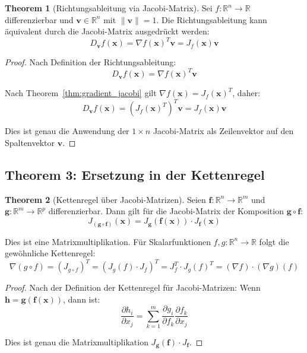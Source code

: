 ﻿\documentclass[a4paper,12pt]{article}
\theoremstyle{definition}
\newtheorem{theorem}{Theorem}
\begin{document}
\begin{theorem}[Richtungsableitung via Jacobi-Matrix]
	\label{thm:directional}
	Sei $f: \mathbb{R}^n \to \mathbb{R}$ differenzierbar und $\boldsymbol{v} \in \mathbb{R}^n$ mit $\|\boldsymbol{v}\| = 1$. Die Richtungsableitung kann äquivalent durch die Jacobi-Matrix ausgedrückt werden:
	\[
	D_{\boldsymbol{v}} f(\boldsymbol{x}) = \nabla f(\boldsymbol{x})^T \boldsymbol{v} = J_f(\boldsymbol{x}) \boldsymbol{v}
	\]
\end{theorem}

\begin{proof}
	Nach Definition der Richtungsableitung:
	\[
	D_{\boldsymbol{v}} f(\boldsymbol{x}) = \nabla f(\boldsymbol{x})^T \boldsymbol{v}
	\]
	
	Nach Theorem~\ref{thm:gradient_jacobi} gilt $\nabla f(\boldsymbol{x}) = J_f(\boldsymbol{x})^T$, daher:
	\[
	D_{\boldsymbol{v}} f(\boldsymbol{x}) = (J_f(\boldsymbol{x})^T)^T \boldsymbol{v} = J_f(\boldsymbol{x}) \boldsymbol{v}
	\]
	
	Dies ist genau die Anwendung der $1 \times n$ Jacobi-Matrix als Zeilenvektor auf den Spaltenvektor $\boldsymbol{v}$.
\end{proof}

\subsection{Theorem 3: Ersetzung in der Kettenregel}

\begin{theorem}[Kettenregel über Jacobi-Matrizen]
	\label{thm:chain}
	Seien $\boldsymbol{f}: \mathbb{R}^n \to \mathbb{R}^m$ und $\boldsymbol{g}: \mathbb{R}^m \to \mathbb{R}^p$ differenzierbar. Dann gilt für die Jacobi-Matrix der Komposition $\boldsymbol{g} \circ \boldsymbol{f}$:
	\[
	J_{(\boldsymbol{g} \circ \boldsymbol{f})}(\boldsymbol{x}) = J_{\boldsymbol{g}}(\boldsymbol{f}(\boldsymbol{x})) \cdot J_{\boldsymbol{f}}(\boldsymbol{x})
	\]
	
	Dies ist eine Matrixmultiplikation. Für Skalarfunktionen $f, g: \mathbb{R}^n \to \mathbb{R}$ folgt die gewöhnliche Kettenregel:
	\[
	\nabla(g \circ f) = (J_{g \circ f})^T = (J_g(f) \cdot J_f)^T = J_f^T \cdot J_g(f)^T = (\nabla f) \cdot (\nabla g)(f)
	\]
\end{theorem}

\begin{proof}
	Nach der Definition der Kettenregel für Jacobi-Matrizen: Wenn $\boldsymbol{h} = \boldsymbol{g}(\boldsymbol{f}(\boldsymbol{x}))$, dann ist:
	\[
	\frac{\partial h_i}{\partial x_j} = \sum_{k=1}^m \frac{\partial g_i}{\partial f_k} \frac{\partial f_k}{\partial x_j}
	\]
	
	Dies ist genau die Matrixmultiplikation $J_{\boldsymbol{g}}(\boldsymbol{f}) \cdot J_{\boldsymbol{f}}$.
\end{proof}
\end{document}
